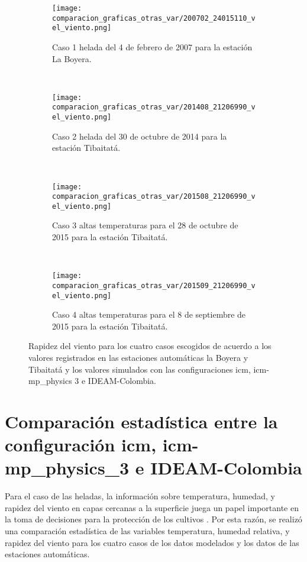 \begin{figure}[H]
    
\begin{subfigure}[normla]{0.4\textwidth}
\caption{Caso 1 helada del 4 de febrero de 2007 para la estación La Boyera.}
\label{caso1_tiba_wrf_vv}
\texttt{[image: comparacion\_graficas\_otras\_var/200702\_24015110\_vel\_viento.png]}
\end{subfigure}
~
\begin{subfigure}[normla]{0.4\textwidth}
\caption{Caso 2 helada del 30 de octubre de 2014 para la estación Tibaitatá.}
\label{caso2_tiba_wrf_vv}
\texttt{[image: comparacion\_graficas\_otras\_var/201408\_21206990\_vel\_viento.png]}
\end{subfigure}
~
\centering
\begin{subfigure}[normla]{0.4\textwidth}
\caption{Caso 3 altas temperaturas para el 28 de octubre de 2015 para la estación Tibaitatá.}
\label{caso3_tiba_wrf_vv}
\texttt{[image: comparacion\_graficas\_otras\_var/201508\_21206990\_vel\_viento.png]}
\end{subfigure}
~
\centering
\begin{subfigure}[normla]{0.4\textwidth}
\caption{Caso 4 altas temperaturas para el 8 de septiembre de 2015 para la estación Tibaitatá.}
\label{caso4_tiba_wrf_vv}
\texttt{[image: comparacion\_graficas\_otras\_var/201509\_21206990\_vel\_viento.png]}
\end{subfigure}

    \caption{Rapidez del viento para los cuatro casos escogidos de acuerdo a los valores registrados en las estaciones automáticas la Boyera y Tibaitatá y los valores simulados con las configuraciones icm, icm-mp\_physics 3 e IDEAM-Colombia.}
    \label{fig:wrf_vv_tibaitata}
\end{figure}


\section{Comparación estadística entre la configuración icm, icm-mp\_physics\_3 e IDEAM-Colombia}

Para el caso de las heladas, la información sobre temperatura, humedad, y rapidez del viento en capas cercanas a la superficie juega un papel importante en la toma de decisiones para la protección de los cultivos \citep{prabha2008}. Por esta razón, se realizó una comparación estadística de las variables temperatura, humedad relativa, y rapidez del viento para los cuatro casos de los datos modelados y los datos de las estaciones automáticas.\\

